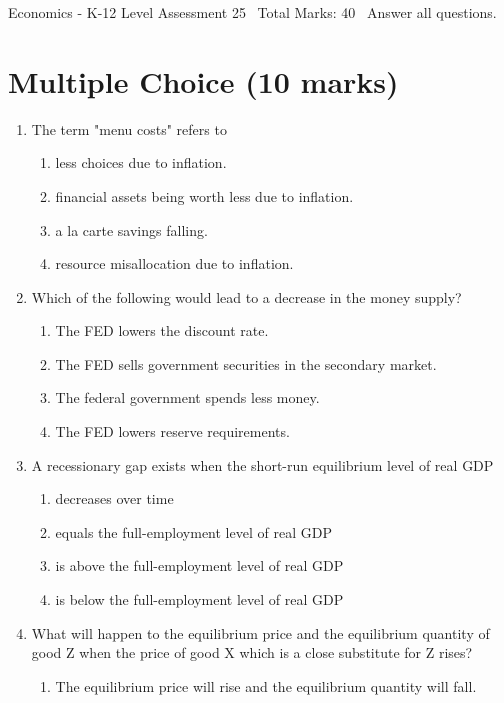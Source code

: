 \documentclass[12pt]{article}
\begin{document}
\begin{center}
Economics - K-12 Level Assessment 25 \
Total Marks: 40 \
Answer all questions.
\end{center}

\section*{Multiple Choice (10 marks)}
\begin{enumerate}[label=\arabic*.]
\item The term "menu costs" refers to
\begin{enumerate}[label=(\alph*)]
    \item less choices due to inflation.
    \item financial assets being worth less due to inflation.
    \item a la carte savings falling.
    \item resource misallocation due to inflation.
\end{enumerate}
\item Which of the following would lead to a decrease in the money supply?
\begin{enumerate}[label=(\alph*)]
    \item The FED lowers the discount rate.
    \item The FED sells government securities in the secondary market.
    \item The federal government spends less money.
    \item The FED lowers reserve requirements.
\end{enumerate}
\item A recessionary gap exists when the short-run equilibrium level of real GDP
\begin{enumerate}[label=(\alph*)]
    \item decreases over time
    \item equals the full-employment level of real GDP
    \item is above the full-employment level of real GDP
    \item is below the full-employment level of real GDP
\end{enumerate}
\item What will happen to the equilibrium price and the equilibrium quantity of good Z when the price of good X which is a close substitute for Z rises?
\begin{enumerate}[label=(\alph*)]
    \item The equilibrium price will rise and the equilibrium quantity will fall.

\end{enumerate}
\end{enumerate}
\end{document}
